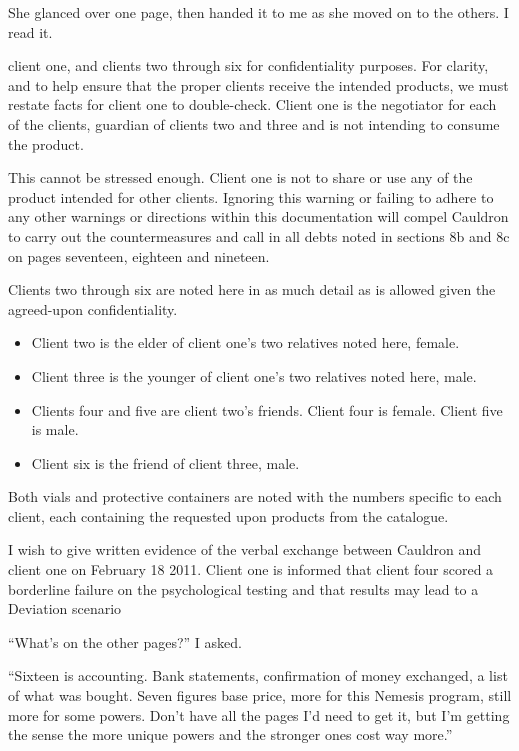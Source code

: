 She glanced over one page, then handed it to me as she moved on to the others.  I read it.



client one, and clients two through six for confidentiality purposes.  For clarity, and to help ensure that the proper clients receive the intended products, we must restate facts for client one to double-check.  Client one is the negotiator for each of the clients, guardian of clients two and three and is not intending to consume the product.



This cannot be stressed enough.  Client one is not to share or use any of the product intended for other clients.  Ignoring this warning or failing to adhere to any other warnings or directions within this documentation will compel Cauldron to carry out the countermeasures and call in all debts noted in sections 8b and 8c on pages seventeen, eighteen and nineteen.



Clients two through six are noted here in as much detail as is allowed given the agreed-upon confidentiality.
\begin{itemize}
    \item Client two is the elder of client one's two relatives noted here, female.
    \item Client three is the younger of client one's two relatives noted here, male.
    \item Clients four and five are client two's friends.  Client four is female.  Client five is male.
    \item Client six is the friend of client three, male.
\end{itemize}

Both vials and protective containers are noted with the numbers specific to each client, each containing the requested upon products from the catalogue.



I wish to give written evidence of the verbal exchange between Cauldron and client one on February 18 2011.  Client one is informed that client four scored a borderline failure on the psychological testing and that results may lead to a Deviation scenario



``What's on the other pages?'' I asked.



``Sixteen is accounting.  Bank statements, confirmation of money exchanged, a list of what was bought.  Seven figures base price, more for this Nemesis program, still more for some powers.  Don't have all the pages I'd need to get it, but I'm getting the sense the more unique powers and the stronger ones cost way more.''



